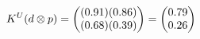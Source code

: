 \documentclass[preview]{standalone}
\begin{document}
\begin{align*}
\special{dvisvgm:raw <g id='unique000'>}K^U(d \otimes p) = \begin{pmatrix} (0.91)(0.86) \\ (0.68)(0.39) \end{pmatrix} = \begin{pmatrix} 0.79 \\ 0.26 \end{pmatrix}\special{dvisvgm:raw </g>}
\end{align*}
\end{document}
